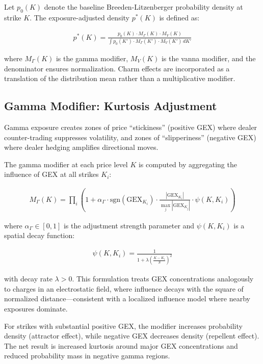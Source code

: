 \documentclass[11pt, a4paper]{article}
\begin{document}
Let $p_0(K)$ denote the baseline Breeden-Litzenberger probability density at strike $K$. The exposure-adjusted density $p^*(K)$ is defined as:

\begin{align}
p^*(K) = \frac{p_0(K) \cdot M_\Gamma(K) \cdot M_V(K)}{\int p_0(K') \cdot M_\Gamma(K') \cdot M_V(K') \, dK'}
\end{align}

where $M_\Gamma(K)$ is the gamma modifier, $M_V(K)$ is the vanna modifier, and the denominator ensures normalization. Charm effects are incorporated as a translation of the distribution mean rather than a multiplicative modifier.

\subsection{Gamma Modifier: Kurtosis Adjustment}

Gamma exposure creates zones of price ``stickiness'' (positive GEX) where dealer counter-trading suppresses volatility, and zones of ``slipperiness'' (negative GEX) where dealer hedging amplifies directional moves.

The gamma modifier at each price level $K$ is computed by aggregating the influence of GEX at all strikes $K_i$:

\begin{align}
M_\Gamma(K) = \prod_i \left(1 + \alpha_\Gamma \cdot \text{sgn}(\text{GEX}_{K_i}) \cdot \frac{|\text{GEX}_{K_i}|}{\max_j |\text{GEX}_{K_j}|} \cdot \psi(K, K_i)\right)
\end{align}

where $\alpha_\Gamma \in [0, 1]$ is the adjustment strength parameter and $\psi(K, K_i)$ is a spatial decay function:

\begin{align}
\psi(K, K_i) = \frac{1}{1 + \lambda \left(\frac{K - K_i}{S}\right)^2}
\end{align}

with decay rate $\lambda > 0$. This formulation treats GEX concentrations analogously to charges in an electrostatic field, where influence decays with the square of normalized distance---consistent with a localized influence model where nearby exposures dominate.

For strikes with substantial positive GEX, the modifier increases probability density (attractor effect), while negative GEX decreases density (repellent effect). The net result is increased kurtosis around major GEX concentrations and reduced probability mass in negative gamma regions.
\end{document}
